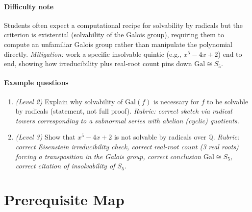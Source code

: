 \documentclass{article}
\begin{document}
\paragraph{Difficulty note}
Students often expect a computational recipe for solvability by radicals but the criterion is existential (solvability of the Galois group), requiring them to compute an unfamiliar Galois group rather than manipulate the polynomial directly. \emph{Mitigation:} work a specific insolvable quintic (e.g., $x^5-4x+2$) end to end, showing how irreducibility plus real-root count pins down $\mathrm{Gal}\cong S_5$.
\paragraph{Example questions}
\begin{enumerate}[nosep]
  \item \emph{(Level 2)} Explain why solvability of $\mathrm{Gal}(f)$ is necessary for $f$ to be solvable by radicals (statement, not full proof). \emph{Rubric: correct sketch via radical towers corresponding to a subnormal series with abelian (cyclic) quotients.}
  \item \emph{(Level 3)} Show that $x^5 - 4x + 2$ is not solvable by radicals over $\mathbb{Q}$. \emph{Rubric: correct Eisenstein irreducibility check, correct real-root count (3 real roots) forcing a transposition in the Galois group, correct conclusion $\mathrm{Gal}\cong S_5$, correct citation of insolvability of $S_5$.}
\end{enumerate}

\section{Prerequisite Map}
\end{document}
